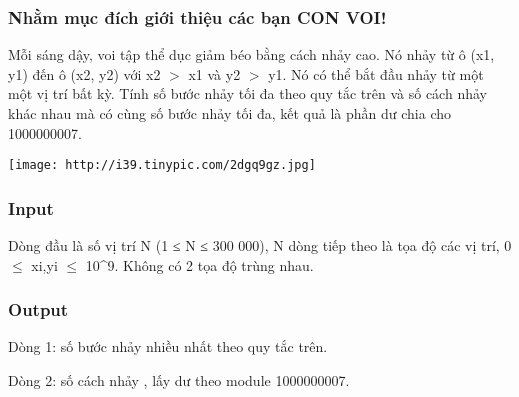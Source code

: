 







\subsubsection{   Nhằm mục đích giới thiệu các bạn CON VOI!  }

   Mỗi sáng dậy, voi tập thể dục giảm béo bằng cách nhảy cao. Nó nhảy từ ô (x1, y1) đến ô (x2, y2) với x2 $>$ x1 và y2 $>$ y1. Nó có thể bắt đầu nhảy từ một một vị trí bất kỳ. Tính số bước nhảy tối đa theo quy tắc trên và số cách nhảy khác nhau mà có cùng số bước nhảy tối đa, kết quả là phần dư chia cho 1000000007.  

\href{http://tinypic.com}{}


\texttt{[image: http://i39.tinypic.com/2dgq9gz.jpg]}

\subsubsection{   Input  }

   Dòng đầu là số vị trí N (1 ≤ N ≤ 300 000), N dòng tiếp theo là tọa độ các vị trí, 0  $\le$ xi,yi $\le$ 10^9. Không có 2 tọa độ trùng nhau.  

\subsubsection{   Output  }

   Dòng 1: số bước nhảy nhiều nhất theo quy tắc trên.   


   Dòng 2: số cách nhảy , lấy dư theo module 1000000007.  

